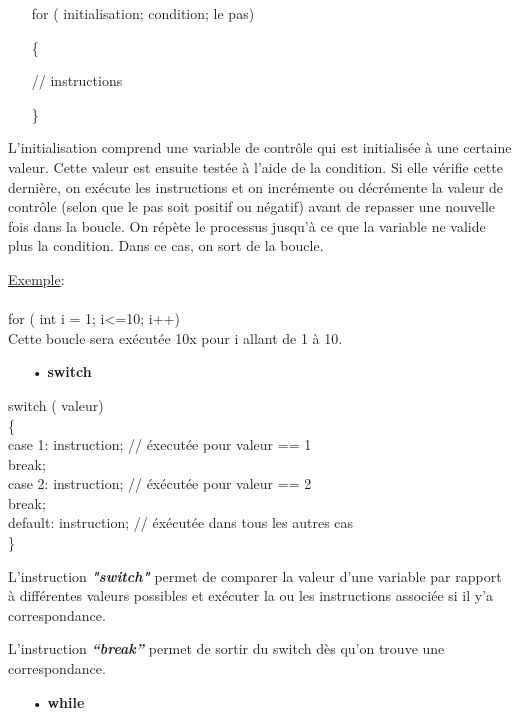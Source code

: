 \documentclass[12pt,a4paper]{article}
\begin{document}
\bigskip
\bigskip
\begin{itemize}
     \item[] for ( initialisation; condition; le pas)
    \item[]  \{
    \item[] // instructions
    \item[]  \}
\end{itemize}

\bigskip
L’initialisation comprend une variable de contrôle qui est initialisée à une certaine valeur. Cette valeur est ensuite testée à l’aide de la condition. Si elle vérifie cette dernière, on exécute les instructions et on incrémente ou décrémente la valeur de contrôle (selon que le pas soit positif ou négatif) avant de repasser une nouvelle fois dans la boucle. On répète le processus jusqu’à ce que la variable ne valide plus la condition. Dans ce cas, on sort de la boucle.


\bigskip
\underline{Exemple}:
\\
\\
for ( int i = 1; i<=10; i++)\\
Cette boucle sera exécutée 10x pour i allant de 1 à 10.
\bigskip

\begin{itemize}
\bigskip
   \item[•] \Large{\textbf{switch}}
\end{itemize}

switch ( valeur)\\
\{ 
\\ case 1: instruction;     \quad   // éxecutée pour valeur == 1
 \\ break;
  \\case 2: instruction;	\quad	// éxécutée pour valeur == 2
 \\ break;
  \\default: instruction;   \quad	// éxécutée dans tous les autres cas
 \\ \} 


\bigskip
L’instruction \textit{\textbf{"switch"}} permet de comparer la valeur d’une variable par rapport à différentes valeurs possibles et exécuter la ou les instructions associée si il y’a correspondance. 

\bigskip
L’instruction \textit{\textbf{ “break”}} permet de sortir du switch dès qu’on trouve une correspondance.

\newpage
\begin{itemize}
\bigskip
   \item[•] \Large{\textbf{while}}
\end{itemize}
\end{document}
